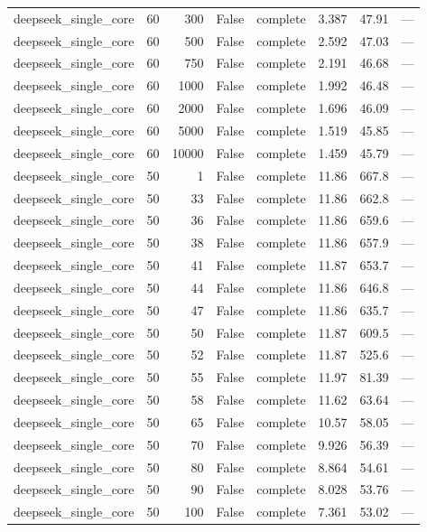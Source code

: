 \begin{tabular}{lrrrlrrl}
deepseek\_single\_core & 60 & 300 & False & complete & 3.387 & 47.91 & — \\
deepseek\_single\_core & 60 & 500 & False & complete & 2.592 & 47.03 & — \\
deepseek\_single\_core & 60 & 750 & False & complete & 2.191 & 46.68 & — \\
deepseek\_single\_core & 60 & 1000 & False & complete & 1.992 & 46.48 & — \\
deepseek\_single\_core & 60 & 2000 & False & complete & 1.696 & 46.09 & — \\
deepseek\_single\_core & 60 & 5000 & False & complete & 1.519 & 45.85 & — \\
deepseek\_single\_core & 60 & 10000 & False & complete & 1.459 & 45.79 & — \\
deepseek\_single\_core & 50 & 1 & False & complete & 11.86 & 667.8 & — \\
deepseek\_single\_core & 50 & 33 & False & complete & 11.86 & 662.8 & — \\
deepseek\_single\_core & 50 & 36 & False & complete & 11.86 & 659.6 & — \\
deepseek\_single\_core & 50 & 38 & False & complete & 11.86 & 657.9 & — \\
deepseek\_single\_core & 50 & 41 & False & complete & 11.87 & 653.7 & — \\
deepseek\_single\_core & 50 & 44 & False & complete & 11.86 & 646.8 & — \\
deepseek\_single\_core & 50 & 47 & False & complete & 11.86 & 635.7 & — \\
deepseek\_single\_core & 50 & 50 & False & complete & 11.87 & 609.5 & — \\
deepseek\_single\_core & 50 & 52 & False & complete & 11.87 & 525.6 & — \\
deepseek\_single\_core & 50 & 55 & False & complete & 11.97 & 81.39 & — \\
deepseek\_single\_core & 50 & 58 & False & complete & 11.62 & 63.64 & — \\
deepseek\_single\_core & 50 & 65 & False & complete & 10.57 & 58.05 & — \\
deepseek\_single\_core & 50 & 70 & False & complete & 9.926 & 56.39 & — \\
deepseek\_single\_core & 50 & 80 & False & complete & 8.864 & 54.61 & — \\
deepseek\_single\_core & 50 & 90 & False & complete & 8.028 & 53.76 & — \\
deepseek\_single\_core & 50 & 100 & False & complete & 7.361 & 53.02 & — \\

\end{tabular}
